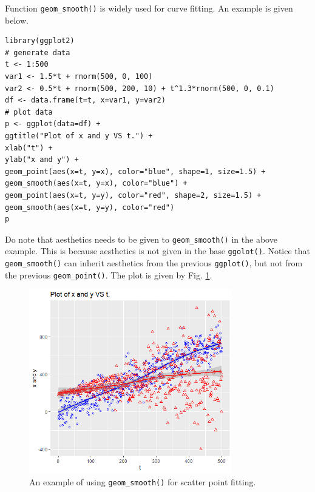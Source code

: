 Function \verb|geom_smooth()| is widely used for curve fitting. An example is given below.
\begin{lstlisting}
library(ggplot2)
# generate data
t <- 1:500
var1 <- 1.5*t + rnorm(500, 0, 100)
var2 <- 0.5*t + rnorm(500, 200, 10) + t^1.3*rnorm(500, 0, 0.1)
df <- data.frame(t=t, x=var1, y=var2)
# plot data
p <- ggplot(data=df) +
ggtitle("Plot of x and y VS t.") +
xlab("t") +
ylab("x and y") +
geom_point(aes(x=t, y=x), color="blue", shape=1, size=1.5) +
geom_smooth(aes(x=t, y=x), color="blue") +
geom_point(aes(x=t, y=y), color="red", shape=2, size=1.5) +
geom_smooth(aes(x=t, y=y), color="red")
p
\end{lstlisting}
Do note that aesthetics needs to be given to \verb|geom_smooth()| in the above example. This is because aesthetics is not given in the base \verb|ggolot()|. Notice that \verb|geom_smooth()| can inherit aesthetics from the previous \verb|ggplot()|, but not from the previous \verb|geom_point()|. The plot is given by Fig. \ref{ch:r1:fig:geom_smooth_demo}.
\begin{figure}
	\centering
	\includegraphics[width=250pt]{chapters/ch-r/figures/geom_smooth_demo.png}
	\caption{An example of using \texttt{geom_smooth()} for scatter point fitting.} \label{ch:r1:fig:geom_smooth_demo}
\end{figure}

